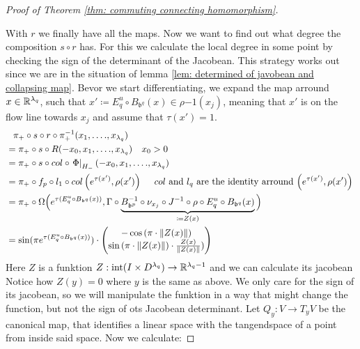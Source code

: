 \begin{proof}[Proof of Theorem \ref{thm: commuting connecting homomorphism}]
\begin{itemize}
		\end{itemize}  
		With $r$ we finally have all the maps. Now we want to find out what degree the composition
		$s\circ r$ has. For this we calculate the local degree in some point by checking the sign of the determinant of the Jacobean. This strategy works out since we are in the situation of lemma \ref{lem: determined of javobean and collapsing map}.
		Bevor we start differentiating, we expand the map arround $x\in \mathbb{R}^{\lambda_q}$, such that $x'\coloneq E^u_q\circ B_{\mathfrak{b}^q}(x)\in \rho{-1}(x_j)$, meaning that $x'$ is on the flow line towards $x_j$ and assume that $\tau(x')=1$.
		\begin{align*}
			&   \phantom{=}	\pi_+\circ s\circ r\circ \pi_+^{-1}(x_1,\dots .,x_{\lambda_q})\\
			&=	\pi_+\circ s\circ R (- x_0,x_1,\dots .,x_{\lambda_q}) \quad x_0>0\\
			&=	\pi_+\circ s\circ col \circ \left.\Phi\right|_{H_-} (-x_0,x_1,\dots .,x_{\lambda_q}) \\
			&=	\pi_+\circ f_p\circ l_1 \circ col \left(e^{\tau(x')},\rho(x')\right) \quad \text{ $col$ and $l_q$ are the identity arround $\left(e^{\tau(x')},\rho(x')\right)$ } \\
			&=\pi_+\circ \Omega  \Big(e^{\tau(E^u_q\circ B_{\mathfrak{b}^q}(x))},\Gamma \circ \underbrace{B_{\mathfrak{b}^p}^{-1} \circ \nu_{x_j}\circ J^{-1}\circ \rho \circ E^u_q\circ B_{\mathfrak{b}^q}(x)}_{\coloneq Z(x)}\Big)\\
			&=\sin(\pi e^{\tau(E^u_q\circ B_{\mathfrak{b}^q}(x))}) \cdot
			\begin{pmatrix}
				-\cos\left(\pi \cdot \left\lVert Z(x)\right\rVert\right)\\
				\sin\left(\pi \cdot \left\lVert Z(x)\right\rVert\right) \cdot \frac{Z(x)}{\left\lVert Z(x)\right\rVert})
			\end{pmatrix}
		\end{align*}
		Here $Z$ is a funktion $Z: \operatorname{\mathrm{int}}(I\times D^{\lambda_q})\to \mathbb{R}^{\lambda_q-1}$ and we can calculate its jacobean Notice how $Z(y)=0$ where $y$ is the same as above. We only care for the sign of its jacobean, so we will manipulate the funktion in a way that might change the function, but not the sign of ots Jacobean determinant. 
		Let $Q_y: V\to T_yV$ be the canonical map, that identifies a linear space with the tangendspace of a point from inside said space. Now we calculate:
		

\end{proof}
